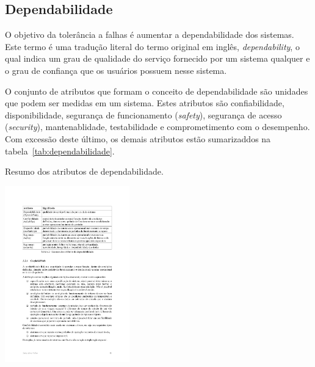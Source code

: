 \subsection{Dependabilidade} %
\label{sub:dependabilidade}

O objetivo da tolerância a falhas é aumentar a dependabilidade dos sistemas. Este termo é uma tradução literal do termo original em inglês, \emph{dependability}, o qual indica um grau de qualidade do serviço fornecido por um sistema qualquer e o grau de confiança que os usuários possuem nesse sistema.

O conjunto de atributos que formam o conceito de dependabilidade são unidades que podem ser medidas em um sistema. Estes atributos são confiabilidade, disponibilidade, segurança de funcionamento (\emph{safety}), segurança de acesso (\emph{security}), mantenablidade, testabilidade e comprometimento com o desempenho. Com excessão deste último, os demais atributos estão sumarizaddos na tabela~\ref{tab:dependabilidade}.

\begin{table}
\begin{center}
\caption{Resumo dos atributos de dependabilidade.}\label{tab:dependabilidade}

	\includegraphics[height=3in]{figuras/tabela_weber.pdf}

\end{center}
\end{table}

